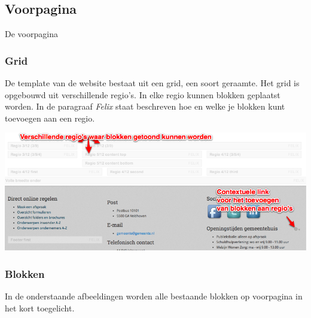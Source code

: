 
\subsection{Voorpagina}\label{voorpagina}

De voorpagina

\subsubsection{Grid}

De template van de website bestaat uit een grid, een soort geraamte. Het grid is opgebouwd uit verschillende regio's. In elke regio kunnen blokken geplaatst worden. In de paragraaf \emph{Felix}  staat beschreven hoe en welke je blokken kunt toevoegen aan een regio. 

\bigskip

\begin{center}
	\includegraphics[width=\textwidth]{img/grid1.png}
\end{center}


\subsubsection{Blokken}

In de onderstaande afbeeldingen worden alle bestaande blokken op voorpagina in het kort toegelicht.

\bigskip

